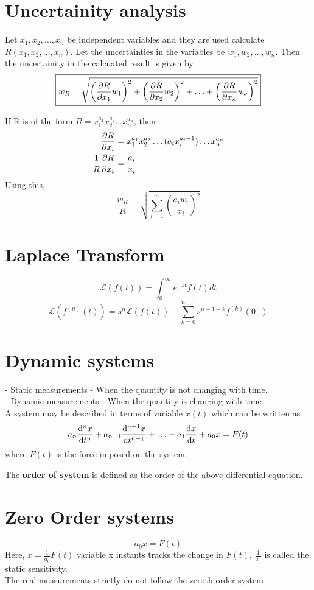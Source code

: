\documentclass{article}
\newcommand{\Lagr}{\mathcal{L}}
\begin{document}
\section{Uncertainity analysis}
Let $x_1, x_2, \hdots, x_n$ be independent variables and they are used calculate $R(x_1,x_2,\hdots,x_n)$. Let the uncertainties in the variables be $w_1,w_2,\hdots,w_n$. Then the uncertainity in the calcuated result is given by
	\[\boxed{w_R = \sqrt{\left(\pdv{R}{x_1} w_1 \right)^2 + \left(\pdv{R}{x_2} w_2 \right)^2 + \hdots + \left(\pdv{R}{x_n} w_\nu \right)^2 }}\]


\noindent If R is of the form $R = x_1^{a_1} x_2^{a_2} \hdots x_n^{a_n}$, then 
	\begin{align*}
		\pdv{R}{x_i} &= x_1^{a_1} x_2^{a_2} \hdots (a_i x_i^{a_i -1}) \hdots x_n^{a_n}\\
		\frac{1}{R}\pdv{R}{x_i} &= \frac{a_i}{x_i}
	\end{align*}
	Using this, 
	\[\frac{w_R}{R} = \sqrt{\sum_{i=1}^n \left(\frac{a_i w_i}{x_i} \right)^2}\]




\section{Laplace Transform}
	\[\Lagr(f(t)) = \int_{0^-}^\infty e^{-st} f(t) dt\]
	\[\Lagr(f^{(n)}(t)) = s^n \Lagr(f(t)) - \sum_{k=0}^{n-1} s^{n-1-k} f^{(k)}(0^-) \]

\section{Dynamic systems}
- Static measurements - When the quantity is not changing with time. \\
- Dynamic measurements - When the quantity is changing with time\\
	A system may be described in terms of variable $x(t)$ which can be written as 
	\[a_n \dv[n]{x}{t} + a_{n-1} \dv[n-1]{x}{t} + \hdots + a_1 \dv{x}{t} + a_0 x= F(t)\]
	where $F(t)$ is the force imposed on the system.

	The \textbf{order of system} is defined as the order of the above differential equation.

\section{Zero Order systems}
	\[a_0 x = F(t)\]
	Here, $x = \frac{1}{a_0} F(t)$ variable x instants tracks the change in $F(t)$, $\frac{1}{a_0}$ is called the static sensitivity.\\
	The real measurements strictly do not follow the zeroth order system 
\end{document}

